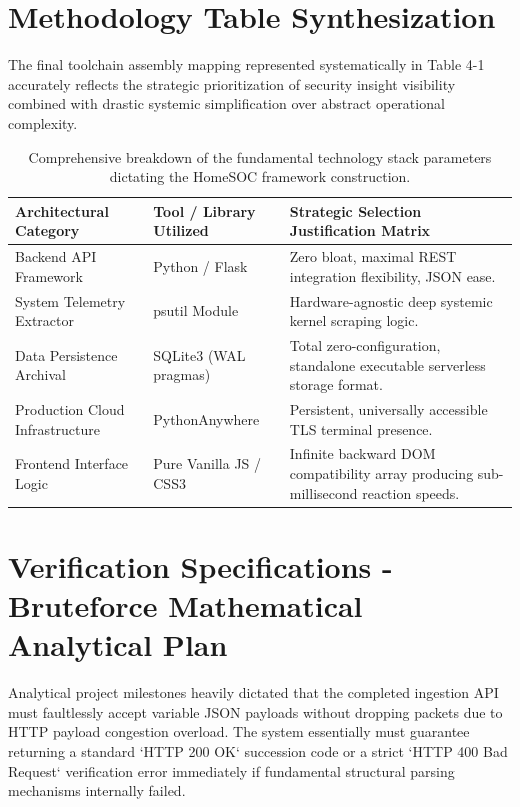 \section{Methodology Table Synthesization}
The final toolchain assembly mapping represented systematically in Table 4-1 accurately reflects the strategic prioritization of security insight visibility combined with drastic systemic simplification over abstract operational complexity.

\begin{table}[h]
\centering
\small
\begin{tabularx}{\textwidth}{|X|X|X|}
\hline
\textbf{Architectural Category} & \textbf{Tool / Library Utilized} & \textbf{Strategic Selection Justification Matrix} \\ \hline
Backend API Framework & Python / Flask & Zero bloat, maximal REST integration flexibility, JSON ease. \\ \hline
System Telemetry Extractor & psutil Module & Hardware-agnostic deep systemic kernel scraping logic. \\ \hline
Data Persistence Archival & SQLite3 (WAL pragmas) & Total zero-configuration, standalone executable serverless storage format. \\ \hline
Production Cloud Infrastructure & PythonAnywhere & Persistent, universally accessible TLS terminal presence. \\ \hline
Frontend Interface Logic & Pure Vanilla JS / CSS3 & Infinite backward DOM compatibility array producing sub-millisecond reaction speeds. \\ \hline
\end{tabularx}
\caption{Comprehensive breakdown of the fundamental technology stack parameters dictating the HomeSOC framework construction.}
\label{tab:method_stack}
\end{table}

\section{Verification Specifications - Bruteforce Mathematical Analytical Plan}
Analytical project milestones heavily dictated that the completed ingestion API must faultlessly accept variable JSON payloads without dropping packets due to HTTP payload congestion overload. The system essentially must guarantee returning a standard `HTTP 200 OK` succession code or a strict `HTTP 400 Bad Request` verification error immediately if fundamental structural parsing mechanisms internally failed. 


